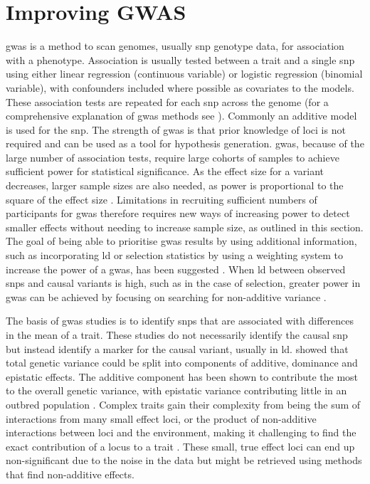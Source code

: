 \documentclass[]{report}
\begin{document}
\section{Improving GWAS}\label{improving-gwas}

\Gls{gwas} is a method to scan genomes, usually \gls{snp} genotype data,
for association with a phenotype. Association is usually tested between
a trait and a single \gls{snp} using either linear regression
(continuous variable) or logistic regression (binomial variable), with
confounders included where possible as covariates to the models. These
association tests are repeated for each \gls{snp} across the genome (for
a comprehensive explanation of \gls{gwas} methods see
\citet{bush_chapter_2012}). Commonly an additive model is used for the
\gls{snp}. The strength of \gls{gwas} is that prior knowledge of loci is
not required and can be used as a tool for hypothesis generation.
\Gls{gwas}, because of the large number of association tests, require
large cohorts of samples to achieve sufficient power for statistical
significance. As the effect size for a variant decreases, larger sample
sizes are also needed, as power is proportional to the square of the
effect size \citep{Hemani2013, Korte2013}. Limitations in recruiting
sufficient numbers of participants for \gls{gwas} therefore requires new
ways of increasing power to detect smaller effects without needing to
increase sample size, as outlined in this section. The goal of being
able to prioritise \gls{gwas} results by using additional information,
such as incorporating \gls{ld} or selection statistics by using a
weighting system to increase the power of a \gls{gwas}, has been
suggested \citep{Roeder2006, Ayodo2007}. When \gls{ld} between observed
\glspl{snp} and causal variants is high, such as in the case of
selection, greater power in \gls{gwas} can be achieved by focusing on
searching for non-additive variance \citep{Hemani2013}.

The basis of \gls{gwas} studies is to identify \glspl{snp} that are
associated with differences in the mean of a trait. These studies do not
necessarily identify the causal \gls{snp} but instead identify a marker
for the causal variant, usually in \gls{ld}. \citet{Fisher1919} showed
that total genetic variance could be split into components of additive,
dominance and epistatic effects. The additive component has been shown
to contribute the most to the overall genetic variance, with epistatic
variance contributing little in an outbred population \citep{Hill2008}.
Complex traits gain their complexity from being the sum of interactions
from many small effect loci, or the product of non-additive interactions
between loci and the environment, making it challenging to find the
exact contribution of a locus to a trait \citep{Fu2013a}. These small,
true effect loci can end up non-significant due to the noise in the data
but might be retrieved using methods that find non-additive effects.
\end{document}
